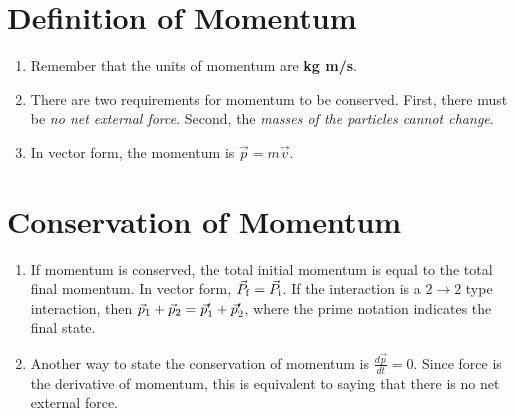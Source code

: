 \documentclass[10pt]{article}
\begin{document}
\maketitle

\section{Definition of Momentum}
\begin{enumerate}
\item Remember that the units of momentum are \textbf{kg m/s}.
\item There are two requirements for momentum to be conserved.  First, there must be \textit{no net external force}.  Second, the \textit{masses of the particles cannot change}.
\item In vector form, the momentum is $\vec{p} = m \vec{v}$.
\end{enumerate}
\section{Conservation of Momentum}
\begin{enumerate}
\item If momentum is conserved, the total initial momentum is equal to the total final momentum.  In vector form, $\vec{P}_{\rm f} = \vec{P}_{\rm i}$.  If the interaction is a $2 \rightarrow 2$ type interaction, then $\vec{p}_{\rm 1} + \vec{p}_{\rm 2} = \vec{p}_{\rm 1}' + \vec{p}_{\rm 2}'$, where the prime notation indicates the final state.
\item Another way to state the conservation of momentum is $\frac{d\vec{p}}{dt} = 0$.  Since force is the derivative of momentum, this is equivalent to saying that there is no net external force.
\end{enumerate}
\end{document}
